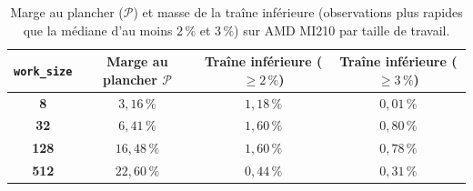 \begin{table}[htb]
    \centering
    \small
    \caption{Marge au plancher ($\mathcal{P}$) et masse de la traîne inférieure (observations plus rapides que la médiane d'au moins $2\,\%$ et $3\,\%$) sur AMD MI210 par taille de travail.}
    \label{tab:mi210_left_tail}
    \renewcommand{\arraystretch}{1.25}
    \begin{tabular}{cccc}
        \toprule
        \textbf{\texttt{work\_size}} & \textbf{Marge au plancher $\mathcal{P}$} & \textbf{Traîne inférieure ($\ge 2\,\%$)} & \textbf{Traîne inférieure ($\ge 3\,\%$)} \\
        \midrule
        \textbf{8}   & $3{,}16\,\%$  & $1{,}18\,\%$ & $0{,}01\,\%$ \\
        \textbf{32}  & $6{,}41\,\%$  & $1{,}60\,\%$ & $0{,}80\,\%$ \\
        \textbf{128} & $16{,}48\,\%$ & $1{,}60\,\%$ & $0{,}78\,\%$ \\
        \textbf{512} & $22{,}60\,\%$ & $0{,}44\,\%$ & $0{,}31\,\%$ \\
        \bottomrule
    \end{tabular}
\end{table}

